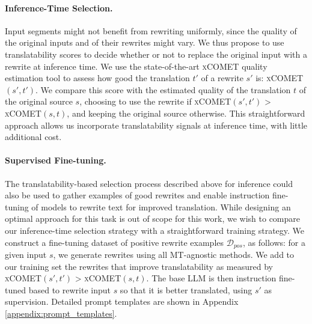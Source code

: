 \paragraph{Inference-Time Selection.}
Input segments might not benefit from rewriting uniformly, since the quality of the original inputs and of their rewrites might vary. We thus propose to use translatability scores to decide whether or not to replace the original input with a rewrite  at inference time. We use the state-of-the-art \textsc{xCOMET} quality estimation tool \citep{guerreiro2023xcomet} to assess how good the translation $t'$ of a rewrite $s'$ is: \textsc{xCOMET}$(s',t')$. We compare this score with the estimated quality of the translation $t$ of the original source $s$, choosing to use the rewrite if \textsc{xCOMET}$(s',t')$ > \textsc{xCOMET}$(s,t)$, and keeping the original source otherwise. This straightforward approach allows us incorporate translatability signals at inference time, with little additional cost.


\paragraph{Supervised Fine-tuning.}
The translatability-based selection process described above for inference could also be used to gather examples of good rewrites and enable instruction fine-tuning of models to rewrite text for improved translation.
%
%
While designing an optimal approach for this task is out of scope for this work,  we wish to compare our inference-time selection strategy with a straightforward training strategy. We construct a fine-tuning dataset of positive rewrite examples $\mathcal{D}_{pos}$, as follows: for a given input $s$, we generate rewrites using all MT-agnostic methods. We add to our training set the rewrites that improve translatability as measured by \textsc{xCOMET}$(s', t')$ > \textsc{xCOMET}$(s,t)$. The base LLM is then instruction fine-tuned based to rewrite input $s$ so that it is better translated, using $s'$ as supervision. Detailed prompt templates are shown in Appendix \ref{appendix:prompt_templates}.

